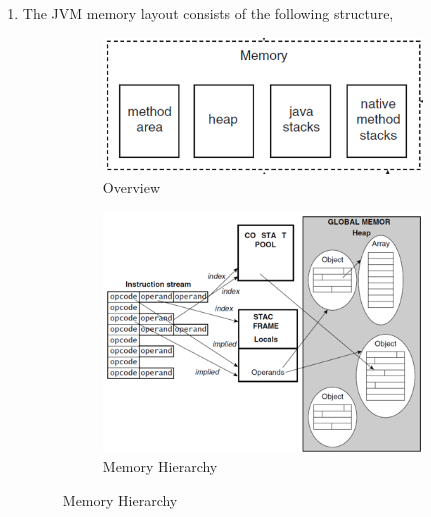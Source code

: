 \documentclass[11pt,a4paper,oneside]{article}
\begin{document}
\begin{enumerate}
		\item The JVM memory layout consists of the following structure,
		      \begin{figure}[H]
		      	\centering
		      	\begin{subfigure}{.4\textwidth}
		      		\centering
		      		\includegraphics[scale=0.5]{1.png}
		      		\caption{Overview}
		      	\end{subfigure}%
		      	\begin{subfigure}{.4\textwidth}
		      		\centering
		      		\includegraphics[scale=0.6]{2.png}
		      		\caption{Memory Hierarchy}
		      	\end{subfigure}		      	
		      \end{figure}
	      \begin{verbatim}
	      	      

\end{verbatim}
\end{enumerate}
\end{document}
